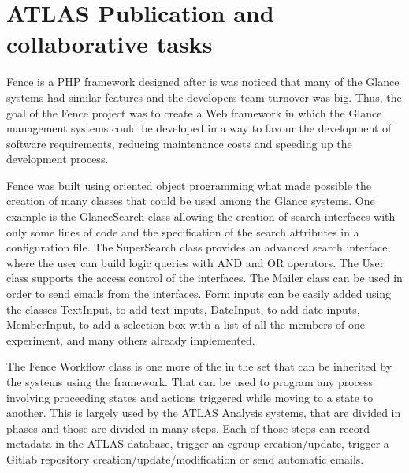 \section{ATLAS Publication and collaborative tasks}
\label{sec:collaborative-tasks}
Fence is a PHP framework designed after is was noticed that many of the Glance systems had similar features and the developers team turnover was big. Thus, the goal of the Fence project was to create a Web framework in which the Glance management systems could be developed in a way to favour the development of software requirements, reducing maintenance costs and speeding up the development process.

Fence was built using oriented object programming what made possible the creation of many classes that could be used among the Glance systems. One example is the GlanceSearch class allowing the creation of search interfaces with only some lines of code and the specification of the search attributes in a configuration file. The SuperSearch class provides an advanced search interface, where the user can build logic queries with AND and OR operators. The User class supports the access control of the interfaces. The Mailer class can be used in order to send emails from the interfaces. Form inputs can be easily added using the classes TextInput, to add text inputs, DateInput, to add date inputs, MemberInput, to add a selection box with a list of all the members of one experiment, and many others already implemented.

The Fence Workflow class is one more of the in the set that can be inherited by the systems using the framework. That can be used to program any process involving proceeding states and actions triggered while moving to a state to another. This is largely used by the ATLAS Analysis systems, that are divided in phases and those are divided in many steps. Each of those steps can record metadata in the ATLAS database, trigger an egroup creation/update, trigger a Gitlab repository creation/update/modification or send automatic emails. 